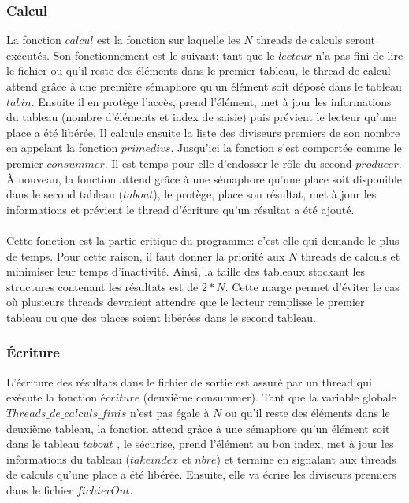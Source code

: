 \documentclass{article}
\begin{document}
\subsubsection{Calcul}
La fonction $calcul$ est la fonction sur laquelle les $N$ threads de calculs seront exécutés. Son fonctionnement est le suivant: tant que le $lecteur$ n'a pas fini de lire le fichier ou qu'il reste des éléments dans le premier tableau, le thread de calcul attend grâce à une première sémaphore qu'un élément soit déposé dans le tableau $tabin$. Ensuite il en protège l'accès, prend l'élément, met à jour les informations du tableau (nombre d'éléments et index de saisie) puis prévient le lecteur qu'une place a été libérée. Il calcule ensuite la liste des diviseurs premiers de son nombre en appelant la fonction $primedivs$. Jusqu'ici la fonction s'est comportée comme le premier $consummer$. Il est temps pour elle d'endosser le rôle du second $producer$. À nouveau, la fonction attend grâce à une sémaphore qu'une place soit disponible dans le second tableau ($tabout$), le protège, place son résultat, met à jour les informations et prévient le thread d'écriture qu'un résultat a été ajouté.\\
\\ \danger
Cette fonction est la partie critique du programme: c'est elle qui demande le plus de temps. Pour cette raison, il faut donner la priorité aux $N$ threads de calculs et minimiser leur temps d'inactivité. Ainsi, la taille des tableaux stockant les structures contenant les résultats est de $2*N$. Cette marge permet d'éviter le cas où plusieurs threads devraient attendre que le lecteur remplisse le premier tableau ou que des places soient libérées dans le second tableau.

\subsubsection{Écriture}
L'écriture des résultats dans le fichier de sortie est assuré par un thread qui exécute la fonction $écriture$ (deuxième consummer). Tant que la variable globale $Threads\_de\_calculs\_finis$ n'est pas égale à $N$ ou qu'il reste des éléments dans le deuxième tableau, la fonction attend grâce à une sémaphore qu'un élément soit dans le tableau $tabout$ , le sécurise, prend l'élément au bon index, met à jour les informations du tableau ($takeindex$ et $nbre$) et termine en signalant aux threads de calculs qu'une place a été libérée. Ensuite, elle va écrire les diviseurs premiers dans le fichier $fichierOut$.
\end{document}
